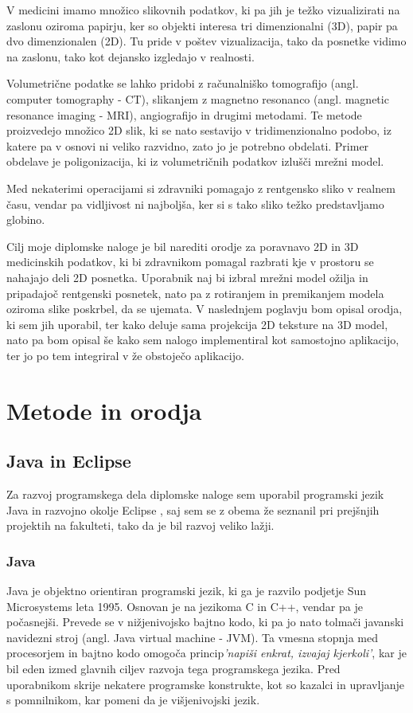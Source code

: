 \documentclass[a4paper, 12pt]{book}
\begin{document}
V medicini imamo množico slikovnih podatkov, ki pa jih je težko vizualizirati na zaslonu oziroma papirju, ker so objekti interesa tri dimenzionalni (3D), papir pa dvo dimenzionalen (2D). Tu pride v poštev vizualizacija, tako da posnetke vidimo na zaslonu, tako kot dejansko izgledajo v realnosti.

Volumetrične podatke se lahko pridobi z računalniško tomografijo (angl. computer tomography - CT), slikanjem z magnetno resonanco (angl. magnetic resonance imaging - MRI), angiografijo in drugimi metodami. Te metode proizvedejo množico 2D slik, ki se nato sestavijo v tridimenzionalno podobo, iz katere pa v osnovi ni veliko razvidno, zato jo je potrebno obdelati. Primer obdelave je poligonizacija, ki iz volumetričnih podatkov izlušči mrežni model. 

Med nekaterimi operacijami si zdravniki pomagajo z rentgensko sliko v realnem času, vendar pa vidljivost ni najboljša, ker si s tako sliko težko predstavljamo globino.

Cilj moje diplomske naloge je bil narediti orodje za poravnavo 2D in 3D medicinskih podatkov, ki bi zdravnikom pomagal razbrati kje v prostoru se nahajajo deli 2D posnetka. Uporabnik naj bi izbral mrežni model ožilja in pripadajoč rentgenski posnetek, nato pa z rotiranjem in premikanjem modela oziroma slike poskrbel, da se ujemata. V naslednjem poglavju bom opisal orodja, ki sem jih uporabil, ter kako deluje sama projekcija 2D teksture na 3D model, nato pa bom opisal še kako sem nalogo implementiral kot samostojno aplikacijo, ter jo po tem integriral v že obstoječo aplikacijo.

\chapter{Metode in orodja}
\section{Java in Eclipse}
Za razvoj programskega dela diplomske naloge sem uporabil programski jezik Java \cite{Java} in razvojno okolje Eclipse \cite{Eclipse}, saj sem se z obema že seznanil pri prejšnjih projektih na fakulteti, tako da je bil razvoj veliko lažji.
\subsection*{Java}
Java je objektno orientiran programski jezik, ki ga je razvilo podjetje Sun Microsystems leta 1995. Osnovan je na jezikoma C in C++, vendar pa je počasnejši. Prevede se v nižjenivojsko bajtno kodo, ki pa jo nato tolmači javanski navidezni stroj (angl. Java virtual machine - JVM). Ta vmesna stopnja med procesorjem in bajtno kodo omogoča princip\emph{'napiši enkrat, izvajaj kjerkoli'}, kar je bil eden izmed glavnih ciljev razvoja tega programskega jezika. Pred uporabnikom skrije nekatere programske konstrukte, kot so kazalci in upravljanje s pomnilnikom, kar pomeni da je višjenivojski jezik. 
\end{document}
